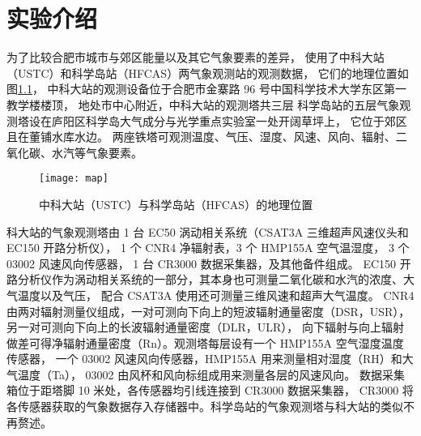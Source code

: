 \chapter{实验介绍}
为了比较合肥市城市与郊区能量以及其它气象要素的差异，
使用了中科大站（USTC）和科学岛站（HFCAS）两气象观测站的观测数据，
它们的地理位置如图\ref{fig:map}，
中科大站的观测设备位于合肥市金寨路 96 号中国科学技术大学东区第一教学楼楼顶，
地处市中心附近，中科大站的观测塔共三层
科学岛站的五层气象观测塔设在庐阳区科学岛大气成分与光学重点实验室一处开阔草坪上，
它位于郊区且在董铺水库水边。
两座铁塔可观测温度、气压、湿度、风速、风向、辐射、二氧化碳、水汽等气象要素。
\begin{figure}[H]
\centering
\texttt{[image: map]}
\caption{中科大站（USTC）与科学岛站（HFCAS）的地理位置}\label{fig:map}
\end{figure}

科大站的气象观测塔由 1 台 EC50 涡动相关系统（CSAT3A 三维超声风速仪头和 EC150 开路分析仪），
1 个 CNR4 净辐射表，3 个 HMP155A 空气温湿度，
3 个 03002 风速风向传感器， 1 台 CR3000 数据采集器，及其他备件组成。
EC150 开路分析仪作为涡动相关系统的一部分，其本身也可测量二氧化碳和水汽的浓度、大气温度以及气压，
配合 CSAT3A 使用还可测量三维风速和超声大气温度。
CNR4 由两对辐射测量仪组成，一对可测向下向上的短波辐射通量密度（DSR，USR），
另一对可测向下向上的长波辐射通量密度（DLR，ULR），
向下辐射与向上辐射做差可得净辐射通量密度（Rn）。观测塔每层设有一个 HMP155A 空气湿度温度传感器，
一个 03002 风速风向传感器，HMP155A 用来测量相对湿度（RH）和大气温度（Ta），
03002 由风杯和风向标组成用来测量各层的风速风向。
数据采集箱位于距塔脚 10 米处，各传感器均引线连接到 CR3000 数据采集器，
CR3000 将各传感器获取的气象数据存入存储器中。科学岛站的气象观测塔与科大站的类似不再赘述。
